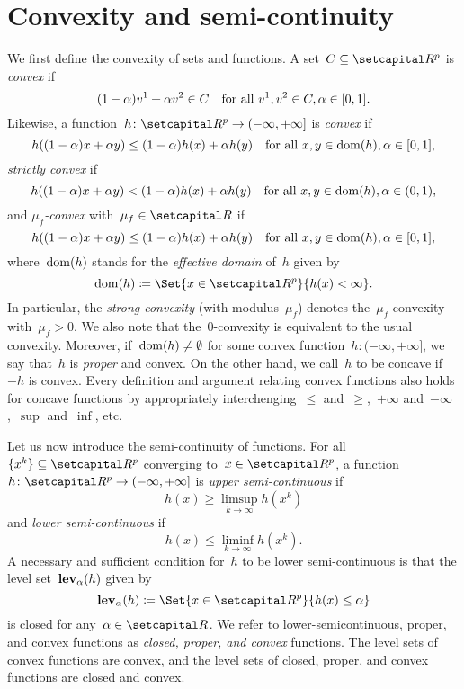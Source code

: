 \documentclass[../main]{subfiles}
\begin{document}
\section{Convexity and semi-continuity}
We first define the convexity of sets and functions.
A set~$C \subseteq \setR^p$ is \emph{convex} if
\[
    (1 - \alpha) v^1 + \alpha v^2 \in C \quad \text{for all~$v^1, v^2 \in C, \alpha \in [0, 1]$}
.\] 
Likewise, a function~$h \colon \setR^p \to (-\infty, +\infty]$ is \emph{convex} if
\[
    h((1 - \alpha) x + \alpha y) \le (1 - \alpha) h(x) + \alpha h(y) \quad \text{for all~$x, y \in \operatorname{dom}(h), \alpha \in [0, 1]$}
,\]
\emph{strictly convex} if
\[
    h((1 - \alpha) x + \alpha y) < (1 - \alpha) h(x) + \alpha h(y) \quad \text{for all~$x, y \in \operatorname{dom}(h), \alpha \in (0, 1)$}
,\] 
and \emph{$\mu_f$-convex} with~$\mu_f \in \setR$ if
\[
    h((1 - \alpha) x + \alpha y) \le (1 - \alpha) h(x) + \alpha h(y) \quad \text{for all~$x, y \in \operatorname{dom}(h), \alpha \in [0, 1]$}
,\] 
where~$\operatorname{dom}(h)$ stands for the \emph{effective domain} of~$h$ given by
\[
    \dom(h) \coloneqq \Set{x \in \setR^p}{h(x) < \infty}
.\] 
In particular, the \emph{strong convexity} (with modulus~$\mu_f$) denotes the~$\mu_f$-convexity with~$\mu_f > 0$.
We also note that the~$0$-convexity is equivalent to the usual convexity.
Moreover, if~$\operatorname{dom}(h) \neq \emptyset$ for some convex function~$h \colon (- \infty, + \infty]$, we say that~$h$ is \emph{proper} and convex.
On the other hand, we call~$h$ to be concave if~$- h$ is convex.
Every definition and argument relating convex functions also holds for concave functions by appropriately interchenging~$\le$ and~$\ge$,~$+ \infty$ and~$- \infty$,~$\sup$ and~$\inf$, etc.

Let us now introduce the semi-continuity of functions.
For all~$\set{x^k} \subseteq \setR^p$ converging to~$x \in \setR^p$, a function~$h \colon \setR^p \to (-\infty, +\infty]$ is \emph{upper semi-continuous} if
\[
    h(x) \ge \limsup_{k \to \infty} h(x^k) 
\] 
and \emph{lower semi-continuous} if
\[
    h(x) \le \liminf_{k \to \infty} h(x^k) 
.\] 
A necessary and sufficient condition for~$h$ to be lower semi-continuous is that the level set~$\operatorname{\mathbf{lev}}_\alpha(h)$ given by
\[ \label{eq:level}
    \level_\alpha(h) \coloneqq \Set{x \in \setR^p}{h(x) \le \alpha}
\] 
is closed for any~$\alpha \in \setR$.
We refer to lower-semicontinuous, proper, and convex functions as \emph{closed, proper, and convex} functions.
The level sets of convex functions are convex, and the level sets of closed, proper, and convex functions are closed and convex.
\end{document}
